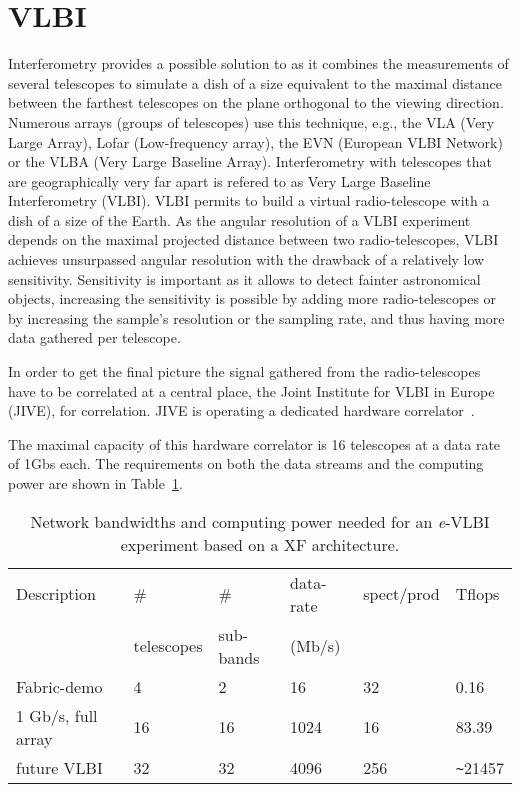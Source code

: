 \section{VLBI}\label{sec:vlbi}
 Interferometry provides a possible
solution to  as it combines the measurements of
several telescopes to simulate a dish of a size equivalent to the
maximal distance between the farthest telescopes on the plane
orthogonal to the viewing direction. Numerous arrays (groups of
telescopes) use this technique, e.g., the VLA (Very Large Array),
Lofar (Low-frequency array), the EVN (European VLBI Network) or the
VLBA (Very Large Baseline Array). Interferometry with telescopes that
are geographically very far apart is refered to as Very Large Baseline
Interferometry (VLBI). VLBI permits to build a virtual radio-telescope
with a dish of a size of the Earth. As the angular resolution of a
VLBI experiment depends on the maximal projected distance between two
radio-telescopes, VLBI achieves unsurpassed angular resolution with
the drawback of a relatively low sensitivity. Sensitivity is important
as it allows to detect fainter astronomical objects, increasing the
sensitivity is possible by adding more radio-telescopes or by
increasing the sample's resolution or the sampling rate, and thus
having more data gathered per telescope.

In order to get the final picture the signal gathered from the
radio-telescopes have to be correlated at a central place, the Joint
Institute for VLBI in Europe (JIVE), for correlation.  JIVE is
operating a dedicated hardware correlator~\cite{EVNCorrelator}.

The maximal capacity of this hardware correlator is 16 telescopes at a
data rate of 1Gbs each. The requirements on both the data streams and
the computing power are shown in Table~\ref{tab:speed}.

\begin{table}
  \centering
  \begin{tabular}[c]{|l|l|l|l|l|l|}
    \hline
    Description & \# & \#  & data-rate & spect/prod & Tflops\\
    & telescopes & sub-bands & (Mb/s) &  & \\
    \hline
    \hline
    Fabric-demo &4 &2 &16 &32 &0.16\\
    1 Gb/s, full array  &16 &16 &1024 &16 &83.39\\
    future VLBI &32 &32 &4096 &256 &\verb|~|21457\\
    \hline
  \end{tabular}
  \caption{Network bandwidths and computing power needed for an {\it e}-VLBI
    experiment based on a XF architecture.}
  \label{tab:speed}
\end{table}

